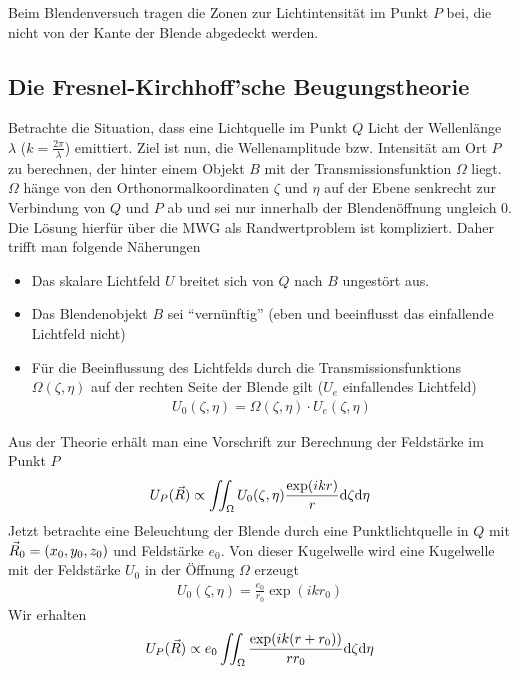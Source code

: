 Beim Blendenversuch tragen die Zonen zur Lichtintensität im Punkt $P$
bei, die nicht von der Kante der Blende abgedeckt werden.

\subsection{Die Fresnel-Kirchhoff'sche Beugungstheorie}
Betrachte die Situation, dass eine Lichtquelle im Punkt $Q$ Licht der
Wellenlänge $\lambda$ ($k=\frac{2\pi}{\lambda}$) emittiert.
Ziel ist nun, die Wellenamplitude bzw. Intensität am Ort $P$ zu
berechnen, der hinter einem Objekt $B$ mit der Transmissionsfunktion
$\Omega$ liegt. $\Omega$ hänge von den Orthonormalkoordinaten $\zeta$
und $\eta$ auf der Ebene senkrecht zur Verbindung von $Q$ und $P$ ab
und sei nur innerhalb der Blendenöffnung ungleich 0.
Die Lösung hierfür über die MWG als Randwertproblem ist
kompliziert. Daher trifft man folgende Näherungen
\begin{itemize}
\item Das skalare Lichtfeld $U$ breitet sich von $Q$ nach $B$
  ungestört aus.
\item Das Blendenobjekt $B$ sei \enquote{vernünftig} (eben und
  beeinflusst das einfallende Lichtfeld nicht)
\item Für die Beeinflussung des Lichtfelds durch die
  Transmissionsfunktions $\Omega(\zeta,\eta)$ auf der rechten Seite der
  Blende gilt ($U_e$ einfallendes Lichtfeld)
  \begin{gather*}
    U_0(\zeta,\eta) = \Omega(\zeta,\eta)\cdot U_e(\zeta,\eta)
  \end{gather*}
\end{itemize}
Aus der Theorie erhält man eine Vorschrift zur Berechnung der
Feldstärke im Punkt $P$
\begin{gather*}
  U_P(\vec{R}) \propto \iint_{\Omega} 
  U_0(\zeta,\eta)\frac{\exp(ikr)}{r}\mathrm{d}\zeta\mathrm{d}\eta
\end{gather*}
Jetzt betrachte eine Beleuchtung der Blende durch eine
Punktlichtquelle in $Q$ mit $\vec{R}_0=(x_0,y_0,z_0)$ und Feldstärke
$e_0$.
Von dieser Kugelwelle wird eine Kugelwelle mit der Feldstärke $U_0$ in
der Öffnung $\Omega$ erzeugt
\begin{gather*}
  U_0(\zeta,\eta) = \frac{e_0}{r_0} \exp(ikr_0)
\end{gather*}
Wir erhalten
\begin{gather}
  U_P(\vec{R}) \propto e_0 \iint_{\Omega} 
  \frac{\exp(ik(r+r_0))}{rr_0}\mathrm{d}\zeta\mathrm{d}\eta
\end{gather}
